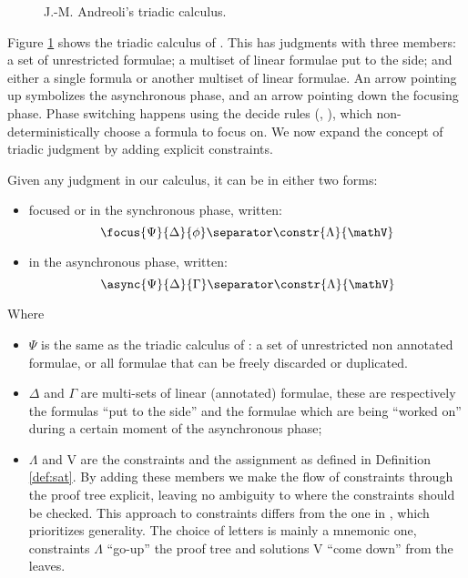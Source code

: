 \begin{figure}[h!]
	\centering
	
	\caption{J.-M. Andreoli's triadic calculus.\label{fig:triadic}}
\end{figure}
Figure \ref{fig:triadic} shows the triadic calculus of \cite{Focusing}.
This has judgments with three members: a set of unrestricted formulae; a multiset of linear formulae put to the side; and either a single formula or another multiset of linear formulae.
An arrow pointing up symbolizes the asynchronous phase, and an arrow pointing down the focusing phase.
Phase switching happens using the decide rules (\derRule[A]{\displaydecide[1]}, \derRule[A]{\displaydecide[2]}), which non-deterministically choose a formula to focus on.
We now expand the concept of triadic judgment by adding explicit constraints.
\begin{define}
	Given any judgment in our calculus, it can be in either two forms:
	\begin{itemize}
		\item focused or in the synchronous phase, written:
			$$\focus{\Psi}{\Delta}{\phi} \separator \constr{\Lambda}{\mathV}$$
		\item in the asynchronous phase, written:
			$$\async{\Psi}{\Delta}{\Gamma} \separator \constr{\Lambda}{\mathV}$$
	\end{itemize}
	Where 
	\begin{itemize}
		\item $\Psi$ is the same as the triadic calculus of \cite{Focusing}: a set of unrestricted non annotated formulae, or all formulae that can be freely discarded or duplicated.
		\item $\Delta$ and $\Gamma$ are multi-sets of linear (annotated) formulae, these are respectively the formulas ``put to the side'' and the formulae which are being ``worked on'' during a certain moment of the asynchronous phase;
		\item $\Lambda$ and V are the constraints and the assignment as defined in Definition \ref{def:sat}.
			By adding these members we make the flow of constraints through the proof tree explicit, leaving no ambiguity to where the constraints should be checked.
			This approach to constraints differs from the one in \cite{HarlandPym}, which prioritizes generality.
			The choice of letters is mainly a mnemonic one, constraints $\Lambda$ ``go-up'' the proof tree and solutions V ``come down'' from the leaves.
	\end{itemize}
\end{define}

